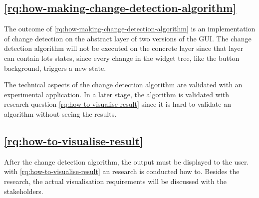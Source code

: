 \subsection{\ref{rq:how-making-change-detection-algorithm} \rqHowMakingChangeDetectionAlgorithm}

The outcome of \ref{rq:how-making-change-detection-algorithm} is an implementation of change detection on the abstract layer of two versions of the GUI. The change detection algorithm will not be executed on the concrete layer since that layer can contain lots states, since every change in the widget tree, like the button background, triggers a new state. 

The technical aspects of the change detection algorithm are validated with an experimental application. In a later stage, the algorithm is validated with research question \ref{rq:how-to-visualise-result} since it is hard to validate an algorithm without seeing the results. 

\subsection{\ref{rq:how-to-visualise-result} \rqHowToVisualiseResult}

After the change detection algorithm, the output must be displayed to the user. with \ref{rq:how-to-visualise-result} an research is conducted how to. Besides the research, the actual visualisation requirements will be discussed with the \testar stakeholders.